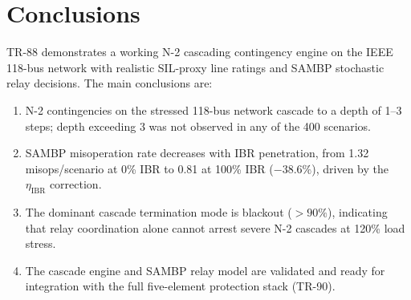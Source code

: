 \documentclass[11pt,a4paper]{article}
\begin{document}
\section{Conclusions}

TR-88 demonstrates a working N-2 cascading contingency engine on the IEEE
118-bus network with realistic SIL-proxy line ratings and SAMBP stochastic
relay decisions.  The main conclusions are:

\begin{enumerate}
  \item N-2 contingencies on the stressed 118-bus network cascade to a
        depth of 1–3 steps; depth exceeding 3 was not observed in any
        of the 400 scenarios.
  \item SAMBP misoperation rate decreases with IBR penetration, from
        1.32 misops/scenario at 0\% IBR to 0.81 at 100\% IBR
        ($-38.6\%$), driven by the $\eta_\text{IBR}$ correction.
  \item The dominant cascade termination mode is blackout ($>90\%$),
        indicating that relay coordination alone cannot arrest severe
        N-2 cascades at 120\% load stress.
  \item The cascade engine and SAMBP relay model are validated and
        ready for integration with the full five-element protection stack
        (TR-90).
\end{enumerate}
\end{document}
